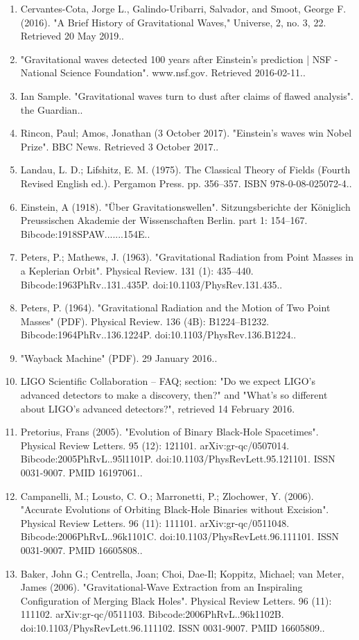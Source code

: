 \begin{enumerate}
\item Cervantes-Cota, Jorge L., Galindo-Uribarri, Salvador, and Smoot, George F. (2016). "A Brief History of Gravitational Waves," Universe, 2, no. 3, 22. Retrieved 20 May 2019..
\item "Gravitational waves detected 100 years after Einstein's prediction | NSF - National Science Foundation". www.nsf.gov. Retrieved 2016-02-11..
\item Ian Sample. "Gravitational waves turn to dust after claims of flawed analysis". the Guardian..
\item Rincon, Paul; Amos, Jonathan (3 October 2017). "Einstein's waves win Nobel Prize". BBC News. Retrieved 3 October 2017..
\item Landau, L. D.; Lifshitz, E. M. (1975). The Classical Theory of Fields (Fourth Revised English ed.). Pergamon Press. pp. 356–357. ISBN 978-0-08-025072-4..
\item Einstein, A (1918). "Über Gravitationswellen". Sitzungsberichte der Königlich Preussischen Akademie der Wissenschaften Berlin. part 1: 154–167. Bibcode:1918SPAW.......154E..
\item Peters, P.; Mathews, J. (1963). "Gravitational Radiation from Point Masses in a Keplerian Orbit". Physical Review. 131 (1): 435–440. Bibcode:1963PhRv..131..435P. doi:10.1103/PhysRev.131.435..
\item Peters, P. (1964). "Gravitational Radiation and the Motion of Two Point Masses" (PDF). Physical Review. 136 (4B): B1224–B1232. Bibcode:1964PhRv..136.1224P. doi:10.1103/PhysRev.136.B1224..
\item "Wayback Machine" (PDF). 29 January 2016..
\item LIGO Scientific Collaboration – FAQ; section: "Do we expect LIGO's advanced detectors to make a discovery, then?" and "What's so different about LIGO's advanced detectors?", retrieved 14 February 2016.
\item Pretorius, Frans (2005). "Evolution of Binary Black-Hole Spacetimes". Physical Review Letters. 95 (12): 121101. arXiv:gr-qc/0507014. Bibcode:2005PhRvL..95l1101P. doi:10.1103/PhysRevLett.95.121101. ISSN 0031-9007. PMID 16197061..
\item Campanelli, M.; Lousto, C. O.; Marronetti, P.; Zlochower, Y. (2006). "Accurate Evolutions of Orbiting Black-Hole Binaries without Excision". Physical Review Letters. 96 (11): 111101. arXiv:gr-qc/0511048. Bibcode:2006PhRvL..96k1101C. doi:10.1103/PhysRevLett.96.111101. ISSN 0031-9007. PMID 16605808..
\item Baker, John G.; Centrella, Joan; Choi, Dae-Il; Koppitz, Michael; van Meter, James (2006). "Gravitational-Wave Extraction from an Inspiraling Configuration of Merging Black Holes". Physical Review Letters. 96 (11): 111102. arXiv:gr-qc/0511103. Bibcode:2006PhRvL..96k1102B. doi:10.1103/PhysRevLett.96.111102. ISSN 0031-9007. PMID 16605809..

\end{enumerate}
